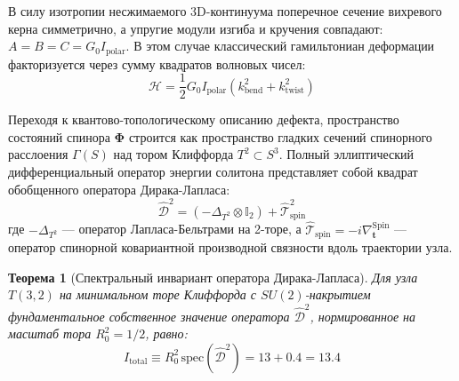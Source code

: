 \documentclass[12pt,a4paper]{article}
\newtheorem{theorem}{Теорема}
\begin{document}
	В силу изотропии несжимаемого 3D-континуума поперечное сечение вихревого керна симметрично, а упругие модули изгиба и кручения совпадают: $A = B = C = G_0 I_{\text{polar}}$. В этом случае классический гамильтониан деформации факторизуется через сумму квадратов волновых чисел:
	\begin{equation}
		\mathcal{H} = \frac{1}{2} G_0 I_{\text{polar}} \left( k_{\text{bend}}^2 + k_{\text{twist}}^2 \right)
	\end{equation}
	
	Переходя к квантово-топологическому описанию дефекта, пространство состояний спинора $\boldsymbol{\Phi}$ строится как пространство гладких сечений спинорного расслоения $\Gamma(S)$ над тором Клиффорда $T^2 \subset S^3$. Полный эллиптический дифференциальный оператор энергии солитона представляет собой квадрат обобщенного оператора Дирака-Лапласа:
	\begin{equation}
		\hat{\mathcal{D}}^2 = \left( -\Delta_{T^2} \otimes \mathbb{I}_2 \right) + \hat{\mathcal{T}}_{\text{spin}}^2
	\end{equation}
	где $-\Delta_{T^2}$ — оператор Лапласа-Бельтрами на 2-торе, а $\hat{\mathcal{T}}_{\text{spin}} = -i \nabla_{\mathbf{t}}^{\mathrm{Spin}}$ — оператор спинорной ковариантной производной связности вдоль траектории узла.
	
	\begin{theorem}[Спектральный инвариант оператора Дирака-Лапласа]
		Для узла $T(3,2)$ на минимальном торе Клиффорда с $SU(2)$-накрытием фундаментальное собственное значение оператора $\hat{\mathcal{D}}^2$, нормированное на масштаб тора $R_0^2 = 1/2$, равно:
		\begin{equation}
			I_{\mathrm{total}} \equiv R_0^2 \, \mathrm{spec}(\hat{\mathcal{D}}^2) = 13 + 0.4 = \mathbf{13.4}
		\end{equation}
	\end{theorem}
	
\end{document}
